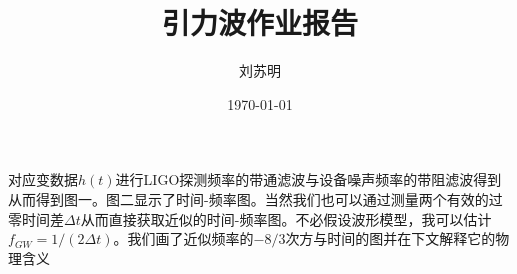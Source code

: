 \documentclass[UTF8]{ctexart}
\title{\heiti 引力波作业报告}
\author{\kaishu 刘苏明}
\date{\today}
\begin{document}
\maketitle

对应变数据$h(t)$进行LIGO探测频率的带通滤波与设备噪声频率的带阻滤波得到从而得到图一。图二显示了时间-频率图。当然我们也可以通过测量两个有效的过零时间差$\Delta t$从而直接获取近似的时间-频率图。不必假设波形模型，我可以估计$f_{GW}=1/(2\Delta t)$。我们画了近似频率的$-8/3$次方与时间的图并在下文解释它的物理含义
\end{document}

